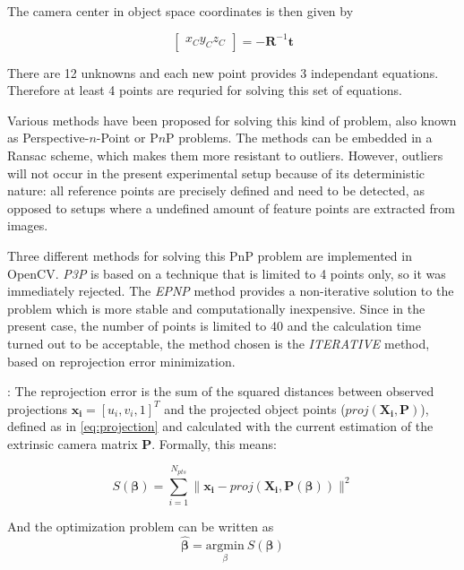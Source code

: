 The camera center in object space coordinates is then given by

\begin{equation}
    \begin{bmatrix} x_C y_C z_C \end{bmatrix} = -\mathbf{R}^{-1} \mathbf{t}
\end{equation}

There are 12 unknowns and each new point provides 3 independant equations. Therefore at least 4 points are requried for solving this set of equations. 

Various methods have been proposed for solving this kind of problem, also known as Perspective-$n$-Point or P$n$P problems. 
The methods can be embedded in a Ransac scheme, which makes them more resistant to outliers. However, outliers will not occur in the present experimental setup because of its deterministic nature: all reference points are precisely defined and need to be detected, as opposed to setups where a undefined amount of feature points are extracted from images.

Three different methods for solving this PnP problem are implemented in OpenCV.
\textit{P3P} is based on a technique that is limited to 4 points only, so it was immediately rejected. The \textit{EPNP} method \cite{Lepetit2009} provides a non-iterative solution to the problem which is more stable and computationally inexpensive. Since in the present case, the number of points is limited to 40 and the calculation time turned out to be acceptable, the method chosen is the \textit{ITERATIVE} method, based on reprojection error minimization.

:
The reprojection error is the sum of the squared distances between observed projections $\mathbf{x_i}=[u_i,v_i,1]^T$ and the projected object points ($proj(\mathbf{X_i},\mathbf{P})$), defined as in \eqref{eq:projection} and calculated with the current estimation of the extrinsic camera matrix $\mathbf{P}$. Formally, this means:

\begin{equation}
S(\boldsymbol\beta) = \sum_{i=1}^{N_{pts}} \| \mathbf{x_i}-proj(\mathbf{X_i},\mathbf{P}(\boldsymbol\beta)) \| ^2
\end{equation}

And the optimization problem can be written as
\begin{equation}
    \hat{\boldsymbol\beta} = \underset{\beta} {\mathrm{argmin}} ~S(\boldsymbol\beta)
\end{equation}

